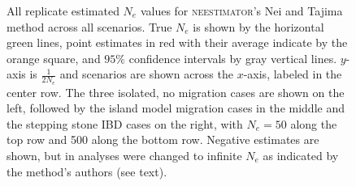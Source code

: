 \begin{landscape}
\begin{figure}[ht]
\centering
{}
\caption[All replicate estimated $N_e$ values for \textsc{neestimator}'s Nei and Tajima method across all scenarios.]{All replicate estimated $N_e$ values for \textsc{neestimator}'s Nei and Tajima method across all scenarios. True $N_e$ is shown by the horizontal green lines, point estimates in red with their average indicate by the orange square, and $95\%$ confidence intervals by gray vertical lines. $y$-axis is $\frac{1}{2 N_e}$ and scenarios are shown across the $x$-axis, labeled in the center row. The three isolated, no migration cases are shown on the left, followed by the island model migration cases in the middle and the stepping stone IBD cases on the right, with $N_e = 50$ along the top row and 500 along the bottom row. Negative estimates are shown, but in analyses were changed to infinite $N_e$ as indicated by the method's authors (see text).}
\label{fig:supp_nei}
\end{figure}



\end{landscape}
